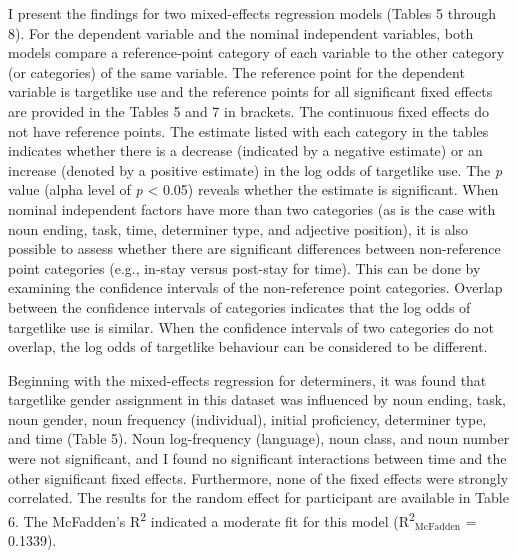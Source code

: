 \documentclass[12pt]{article}
\newcommand\textsubscript[1]{\ensuremath{{}_{\text{#1}}}}
\newenvironment{styleNoSpacing}{\setlength\leftskip{0cm}\setlength\rightskip{0cm plus 1fil}\setlength\parindent{0cm}\setlength\parfillskip{0pt plus 1fil}\setlength\parskip{0cm plus 1pt}\writerlistparindent\writerlistleftskip\leavevmode\normalfont\normalsize\fontsize{11pt}{13.2pt}\selectfont\writerlistlabel\ignorespaces}{\unskip\vspace{0cm plus 1pt}\par}
\newcommand\writerlistleftskip{}
\newcommand\writerlistparindent{}
\newcommand\writerlistlabel{}
\begin{document}
\begin{styleNoSpacing}
I present the findings for two mixed-effects regression models (Tables 5 through 8). For the dependent variable and the nominal independent variables, both models compare a reference-point category of each variable to the other category (or categories) of the same variable. The reference point for the dependent variable is targetlike use and the reference points for all significant fixed effects are provided in the Tables 5 and 7 in brackets. The continuous fixed effects do not have reference points. The estimate listed with each category in the tables indicates whether there is a decrease (indicated by a negative estimate) or an increase (denoted by a positive estimate) in the log odds of targetlike use. The \textit{p} value (alpha level of \textit{p} {\textless} 0.05) reveals whether the estimate is significant. When nominal independent factors have more than two categories (as is the case with noun ending, task, time, determiner type, and adjective position), it is also possible to assess whether there are significant differences between non-reference point categories (e.g., in-stay versus post-stay for time). This can be done by examining the confidence intervals of the non-reference point categories. Overlap between the confidence intervals of categories indicates that the log odds of targetlike use is similar. When the confidence intervals of two categories do not overlap, the log odds of targetlike behaviour can be considered to be different.
\end{styleNoSpacing}

\begin{styleNoSpacing}
Beginning with the mixed-effects regression for determiners, it was found that targetlike gender assignment in this dataset was influenced by noun ending, task, noun gender, noun frequency (individual), initial proficiency, determiner type, and time (Table 5). Noun log-frequency (language), noun class, and noun number were not significant, and I found no significant interactions between time and the other significant fixed effects. Furthermore, none of the fixed effects were strongly correlated. The results for the random effect for participant are available in Table 6. The McFadden’s R\textsuperscript{2} indicated a moderate fit for this model (R\textsuperscript{2}\textsubscript{McFadden} = 0.1339).
\end{styleNoSpacing}
\end{document}
